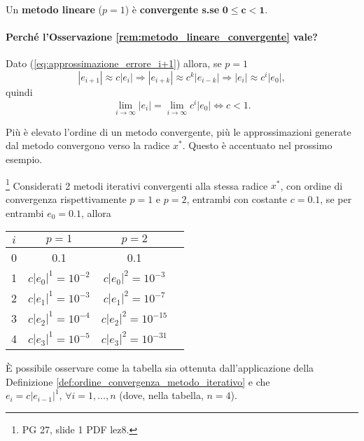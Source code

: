 \begin{remark}\label{rem:metodo_lineare_convergente}
	Un \textbf{\gls{metodo lineare}} ($p=1$) è \textbf{convergente s.se} $\boldsymbol{0\leq c<1}$.
\end{remark}

\paragraph{Perché l'Osservazione \ref{rem:metodo_lineare_convergente} vale?} Dato (\ref{eq:approssimazione_errore_i+1}) allora, se $p=1$
\begin{equation*}
	|e_{i+1}|\approx c|e_i|\Rightarrow |e_{i+k}|\approx c^k|e_{i-k}|\Rightarrow |e_i|\approx c^i|e_0|,
\end{equation*}
quindi
\begin{equation*}
	\underset{i\to\infty}{\lim}|e_i|=\underset{i\to\infty}{\lim}{c^i|e_0|}\iff c<1.
\end{equation*}

Più è elevato l'ordine di un metodo convergente, più le approssimazioni generate dal metodo convergono verso la radice $x^*$. Questo è accentuato nel prossimo esempio.

\begin{example}
	\footnote{PG 27, slide 1 PDF lez8.} Considerati 2 metodi iterativi convergenti alla stessa radice $x^*$, con ordine di convergenza rispettivamente $p=1$ e $p=2$, entrambi con costante $c=0.1$, se per entrambi $e_0=0.1$, allora
	\begin{center}
		\begin{tabular}{ |c|c|c|c| } 
			\hline
			$i$ & $p=1$ & $p=2$ \\
			\hline
			0 & 0.1 & 0.1 \\ 
			1 & $c|e_0|^1=10^{-2}$ & $c|e_0|^2=10^{-3}$ \\ 
			2 & $c|e_1|^1=10^{-3}$ & $c|e_1|^2=10^{-7}$\\
			3 & $c|e_2|^1=10^{-4}$ & $c|e_2|^2=10^{-15}$\\
			4 & $c|e_3|^1=10^{-5}$ & $c|e_3|^2=10^{-31}$\\
			\hline
		\end{tabular}
	\end{center}
	
	È possibile osservare come la tabella sia ottenuta dall'applicazione della Definizione \ref{def:ordine_convergenza_metodo_iterativo} e che $e_i=c|e_{i-1}|^1,\, \forall i=1,\hdots , n$ (dove, nella tabella, $n=4$).
\end{example}

